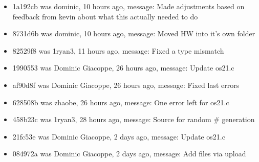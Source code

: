 \documentclass[IEEEtran,letterpaper,10pt,notitlepage,draftclsnofoot,onecolumn]{article}
\begin{document}
\begin{itemize}
\item 1a192cb was dominic, 10 hours ago, message: Made adjustments based on feedback from kevin about what this actually needed to do
\item 8731d6b was dominic, 10 hours ago, message: Moved HW into it's own folder
\item 82529f8 was 1ryan3, 11 hours ago, message: Fixed a type mismatch
\item 1990553 was Dominic Giacoppe, 26 hours ago, message: Update os21.c
\item af90d8f was Dominic Giacoppe, 26 hours ago, message: Fixed last errors
\item 628508b was zhaobe, 26 hours ago, message: One error left for os21.c
\item 458b23c was 1ryan3, 28 hours ago, message: Source for random \# generation
\item 21fc53e was Dominic Giacoppe, 2 days ago, message: Update os21.c
\item 084972a was Dominic Giacoppe, 2 days ago, message: Add files via upload
\end{itemize}
\end{document}
